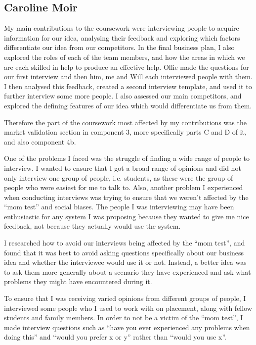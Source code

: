 \documentclass[10pt, a4paper]{article}
\begin{document}
\begin{appendices}
\subsection{Caroline Moir}
My main contributions to the coursework were interviewing people to acquire information for our idea, analysing their feedback and exploring which factors differentiate our idea from our competitors. In the final business plan, I also explored the roles of each of the team members, and how the areas in which we are each skilled in help to produce an effective help. Ollie made the questions for our first interview and then him, me and Will each interviewed people with them. I then analysed this feedback, created a second interview template, and used it to further interview some more people. I also assessed our main competitors, and explored the defining features of our idea which would differentiate us from them.

Therefore the part of the coursework most affected by my contributions was the market validation section in component 3, more specifically parts C and D of it, and also component 4b.

One of the problems I faced was the struggle of finding a wide range of people to interview. I wanted to ensure that I got a broad range of opinions and did not only interview one group of people, i.e. students, as these were the group of people who were easiest for me to talk to. Also, another problem I experienced when conducting interviews was trying to ensure that we weren’t affected by the “mom test” and social biases. The people I was interviewing may have been enthusiastic for any system I was proposing because they wanted to give me nice feedback, not because they actually would use the system.

I researched how to avoid our interviews being affected by the “mom test”, and found that it was best to avoid asking questions specifically about our business idea and whether the interviewee would use it or not. Instead, a better idea was to ask them more generally about a scenario they have experienced and ask what problems they might have encountered during it.

To ensure that I was receiving varied opinions from different groups of people, I interviewed some people who I used to work with on placement, along with fellow students and family members. In order to not be a victim of the “mom test”, I made interview questions such as “have you ever experienced any problems when doing this” and “would you prefer x or y” rather than “would you use x”.


\end{appendices}
\end{document}
